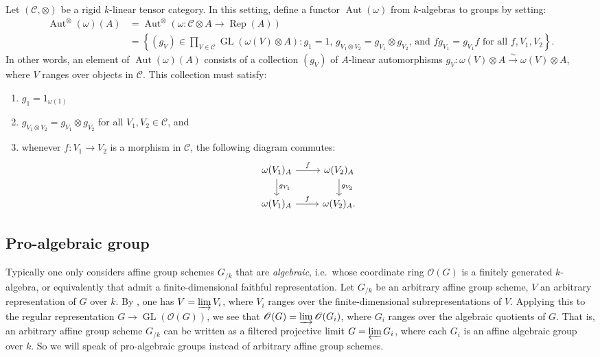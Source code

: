 \documentclass{article}
\DeclareMathOperator{\aut}{Aut}
\DeclareMathOperator{\GL}{GL}
\DeclareMathOperator{\rep}{Rep}
\newcommand{\cC}{\mathcal{C}}
\newcommand{\sO}{\mathscr{O}}
\newcommand{\iso}{\xrightarrow\sim}
\begin{document}
Let $(\cC,\otimes)$ be a rigid $k$-linear tensor category. In this setting, 
define a functor $\aut(\omega)$ from $k$-algebras to groups by setting: 
\begin{align*}
  \aut^\otimes(\omega)(A) 
    &= \aut^\otimes\left(\omega:\cC\otimes A\to \rep(A)\right) \\
    &= \left\{(g_V)\in \prod_{V\in \cC} \GL(\omega(V)\otimes A):g_1=1\text{, }g_{V_1\otimes V_2} = g_{V_1}\otimes g_{V_2}\text{, and }f g_{V_1} = g_{V_1} f\text{ for all }f,V_1,V_2\right\} .
\end{align*}
In other words, an element of $\aut(\omega)(A)$ consists of a collection 
$(g_V)$ of $A$-linear automorphisms 
$g_V:\omega(V)\otimes A\iso \omega(V)\otimes A$, where $V$ ranges over objects 
in $\cC$. This collection must satisfy: 
\begin{enumerate}
  \item $g_1 = 1_{\omega(1)}$
  \item $g_{V_1\otimes V_2} = g_{V_1}\otimes g_{V_2}$ for all $V_1,V_2\in \cC$, and 
  \item whenever $f:V_1\to V_2$ is a morphism in $\cC$, the following diagram 
    commutes: 
    \[
    \begin{tikzcd}
      \omega(V_1)_A \ar[r, "f"] \ar[d, "g_{V_1}"] 
        & \omega(V_2)_A \ar[d, "g_{V_2}"] \\
      \omega(V_1)_A \ar[r, "f"] 
        & \omega(V_2)_A .
    \end{tikzcd}
    \]
\end{enumerate}


\subsection{Pro-algebraic group}

Typically one only considers affine group schemes $G_{/k}$ that are 
\emph{algebraic}, i.e.~whose coordinate ring $\sO(G)$ is a finitely generated 
$k$-algebra, or equivalently that admit a finite-dimensional faithful 
representation. Let $G_{/k}$ be an arbitrary affine group scheme, $V$ an 
arbitrary representation of $G$ over $k$. By 
\cite[Cor.~2.4]{deligne-milne-1982}, one has $V=\varinjlim V_i$, where $V_i$ 
ranges over the finite-dimensional subrepresentations of $V$. Applying this to 
the regular representation $G\to \GL(\sO(G))$, we see that 
$\sO(G)=\varinjlim\sO(G_i)$, where $G_i$ ranges over the algebraic quotients of 
$G$. That is, an arbitrary affine group scheme $G_{/k}$ can be written as a 
filtered projective limit $G=\varprojlim G_i$, where each $G_i$ is an affine 
algebraic group over $k$. So we will speak of pro-algebraic groups instead of 
arbitrary affine group schemes. 
\end{document}
